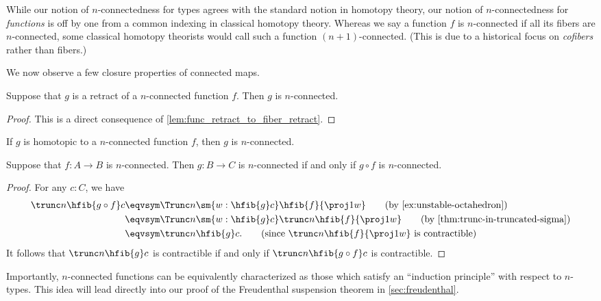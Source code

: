 \begin{rmk}\label{rmk:connectedness-indexing}
  While our notion of $n$-connectedness for types agrees with the standard notion in homotopy theory, our notion of $n$-connectedness for \emph{functions} is off by one from a common indexing in classical homotopy theory.
  Whereas we say a function $f$ is $n$-connected if all its fibers are $n$-connected, some classical homotopy theorists would call such a function $(n+1)$-connected.
  (This is due to a historical focus on \emph{cofibers} rather than fibers.)
\end{rmk}

We now observe a few closure properties of connected maps.

\begin{lem}
%
Suppose that $g$ is a retract of a $n$-connected function $f$.  Then $g$ is
$n$-connected.
\end{lem}
\begin{proof}
This is a direct consequence of \cref{lem:func_retract_to_fiber_retract}.
\end{proof}

\begin{cor}
If $g$ is homotopic to a $n$-connected function $f$, then $g$ is $n$-connected.
\end{cor}

\begin{lem}\label{lem:nconnected_postcomp}
Suppose that $f:A\to B$ is $n$-connected. Then $g:B\to C$ is $n$-connected if and only if $g\circ f$ is
$n$-connected.
\end{lem}

\begin{proof}
For any $c:C$, we have
\begin{align*}
  \trunc n{\hfib{g\circ f}c}
  & \eqvsym \Trunc n{ \sm{w:\hfib{g}c}\hfib{f}{\proj1 w}}
  \tag{by \cref{ex:unstable-octahedron}}\\
  & \eqvsym \Trunc n{\sm{w:\hfib{g}c} \trunc n{\hfib{f}{\proj1 w}}}
  \tag{by \cref{thm:trunc-in-truncated-sigma}}\\
  & \eqvsym \trunc n{\hfib{g}c}.
  \tag{since $\trunc n{\hfib{f}{\proj1 w}}$ is contractible}
\end{align*}
It follows that $\trunc n{\hfib{g}c}$ is contractible if and only if $\trunc n{\hfib{g\circ f}c}$ is
contractible.
\end{proof}

Importantly, $n$-connected functions can be equivalently characterized as those which satisfy an ``induction principle'' with respect to $n$-types.
This idea will lead directly into our proof of the Freudenthal suspension theorem in \cref{sec:freudenthal}.

